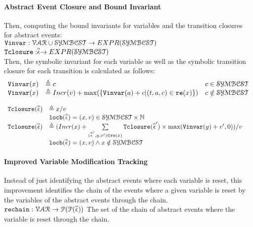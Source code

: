 \paragraph*{Abstract Event Closure and Bound Invariant}
Then, computing the bound invariants for variables and the transition closures for abstract events:
\\ 
$ {\mathtt{Vinvar}}: \mathcal{VAR} \cup \mathcal{SYMBCST} \to EXPR(\mathcal{SYMBCST})$
\\
${\mathtt{Tclosure}}: \stackrel{\scriptscriptstyle{\alpha}}{\mathtt{\epsilon}{}} \to EXPR(\mathcal{SYMBCST})$
\\
Then, the symbolic invariant for each variable 
as well as the symbolic transition closure for each transition is calculated as follows:
\[ 
\begin{array}{lll}
  {\ensuremath{\mathtt{Vinvar}}}(x) & \triangleq c & c \in \mathcal{SYMBCST} \\
  {\mathtt{Vinvar}}(x) & \triangleq Incr(v) + \max(\{{\mathtt{Vinvar}}(a) + c | (t, a, c) \in \mathtt{re}(x)\}) & c \notin \mathcal{SYMBCST}
\end{array}
\]
%
\begin{defn}
  \label{def:transition_closure_base}
\[ 
\begin{array}{lll}
  {\ensuremath{\mathtt{Tclosure}}}(\stackrel{\scriptscriptstyle{\alpha}}{\mathtt{\epsilon}{}}) 
  & \triangleq x / v & \\ 
  & \mathtt{locb}(\stackrel{\scriptscriptstyle{\alpha}}{\mathtt{\epsilon}{}}) = (x, v) \in \mathcal{SYMBCST} \times \mathbb{N} & \\
  {\mathtt{Tclosure}}(\stackrel{\scriptscriptstyle{\alpha}}{\mathtt{\epsilon}{}}) 
  & \triangleq (Incr(x) + 
  \sum\limits_{(\stackrel{\scriptscriptstyle{\alpha}}{\mathtt{\epsilon}{}}', y, v') \in \mathtt{re}(x)}
  {\mathtt{Tclosure}}(\stackrel{\scriptscriptstyle{\alpha}}{\mathtt{\epsilon}{}}') \times \max({\mathtt{Vinvar}}(y) + v', 0) ) / v & \\
  & \mathtt{locb}(\stackrel{\scriptscriptstyle{\alpha}}{\mathtt{\epsilon}{}}) = (x, v) \land x \notin \mathcal{SYMBCST} & 
\end{array}
  \]
\end{defn}
%
\paragraph*{Improved Variable Modification Tracking}
Instead of just identifying the abstract events where each variable is reset,
this improvement identifies the chain of the events where a given variable is reset by the 
variables of the abstract events through the chain.
\\
$\mathtt{rechain}: \mathcal{VAR} \to \mathcal{P}(\mathcal{P}(\stackrel{\scriptscriptstyle{\alpha}}{\mathtt{\epsilon}{}})) $
The set of the chain of abstract events where the variable is reset through the chain.
%

